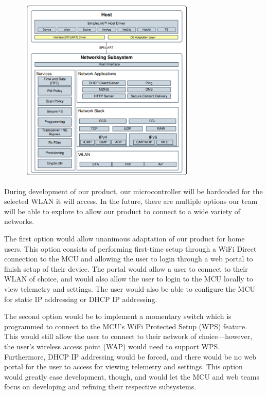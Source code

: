 \begin{flushleft}
\begin{figure}[H]
        \label{cc3220_network_subsystem}
        \centering
        \includegraphics[width=0.75\textwidth]{images/cc3220_network_subsystem.png}
    \end{figure}
    During development of our product, our microcontroller will be hardcoded
    for the selected WLAN it will access. In the future, there are multiple
    options our team will be able to explore to allow our product to connect to
    a wide variety of networks. 
\end{flushleft}   
\begin{flushleft}
    The first option would allow unanimous adaptation of
    our product for home users. This option consists of performing first-time
    setup through a WiFi Direct connection to the MCU and allowing the user
    to login through a web portal to finish setup of their device. The portal
    would allow a user to connect to their WLAN of choice, and would
    also allow the user to login to the MCU locally to view telemetry and 
    settings. The user would also be able to configure the MCU for static
    IP addressing or DHCP IP addressing.
\end{flushleft}
\begin{flushleft}
    The second option would be to implement a momentary switch which is
    programmed to connect to the MCU's WiFi Protected Setup (WPS) feature.
    This would still allow the user to connect to their network of
    choice---however, the user's wireless access point (WAP) would need to
    support WPS. Furthermore, DHCP IP addressing would be forced, and there
    would be no web portal for the user to access for viewing telemetry and
    settings. This option would greatly ease development, though, and would
    let the MCU and web teams focus on developing and refining their
    respective subsystems.
\end{flushleft}
